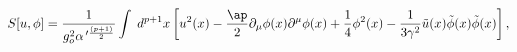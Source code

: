 \begin{equation}
S[u,\phi]=\frac{1}{g_o^2\alpha^{\,\prime \frac{(p+1)}{2}}} \int\;
d^{p+1}x\left[ u^2(x)- \frac{\ap}2
\partial _\mu \phi(x)\partial ^\mu \phi(x)+\frac14 \phi^2(x) -
\frac{1}{3\gamma^2} \tilde{u}(x)\tilde{\phi}(x)\tilde{\phi}(x)
\right], \label{action-x}
\end{equation}

